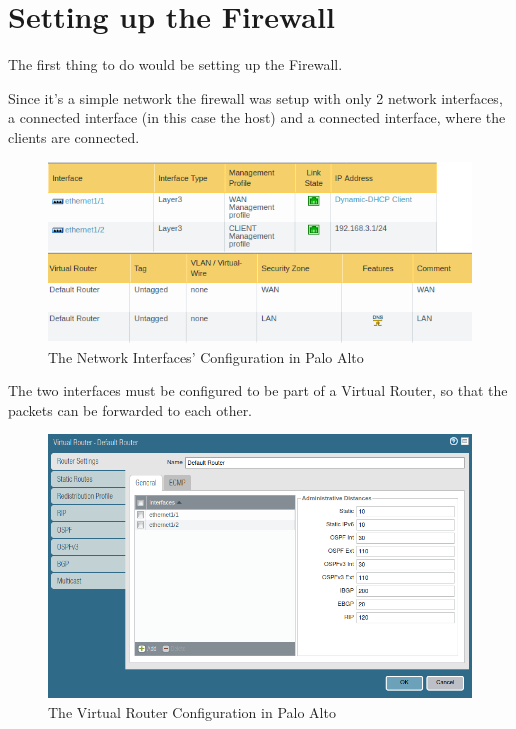 \newpage

\section{Setting up the Firewall}

The first thing to do would be setting up the Firewall.

Since it's a simple network the firewall was setup with only 2 network interfaces, a  connected interface (in this case the host) and a  connected interface, where the clients are connected.

\begin{figure}[!hb]
 \centering
 \includegraphics[width=13cm]{img/network_config.png}
 \caption{The Network Interfaces' Configuration in Palo Alto }
 \label{Network Interfaces Configuration}
\end{figure}


The two interfaces must be configured to be part of a Virtual Router, so that the packets can be forwarded to each other.

\begin{figure}[!hb]
 \centering
 \includegraphics[width=13cm]{img/virtual_router.png}
 \caption{The Virtual Router Configuration in Palo Alto }
 \label{Virtual Router Configuration}
\end{figure}


